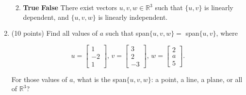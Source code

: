 \documentclass[12 pt]{report}
\begin{document}
\begin{enumerate}
\begin{enumerate}
\vfill 

\item \textbf{True} \hspace{5pt} \textbf{False} \hspace{5pt} There exist vectors $u, v, w \in \mathbb{R}^3$ such that $\{u,v\}$ is linearly dependent, and $\{u,v,w\}$ is linearly independent. 

\vfill 

\end{enumerate}

\newpage

\item (10 points) Find all values of $a$ such that span$\{u,v,w\} = $ span$\{u, v\}$, where 

\begin{equation*}
u = \begin{bmatrix} 1 \\ -2 \\ 1 \end{bmatrix}, \, v = \begin{bmatrix} 3 \\ 2 \\ -3 \end{bmatrix}, \, w = \begin{bmatrix} 2 \\ a \\ 5 \end{bmatrix}.
\end{equation*}

For those values of $a$, what is the span$\{u,v,w\}$: a point, a line, a plane, or all of $\mathbb{R}^3$?
\end{enumerate}
\end{document}
